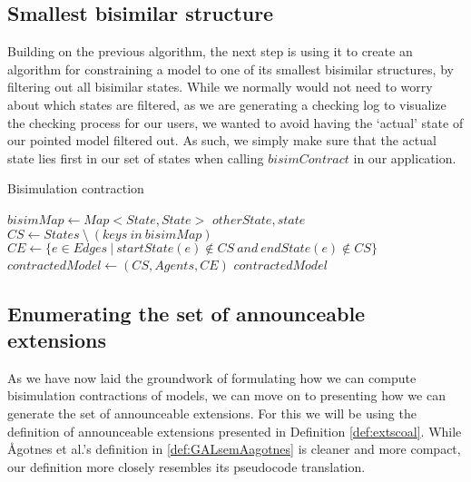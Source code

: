 \subsection{Smallest bisimilar structure}

Building on the previous algorithm, the next step is using it to create an algorithm for constraining a model to one of its smallest bisimilar structures, by filtering out all bisimilar states. While we normally would not need to worry about which states are filtered, as we are generating a checking log to visualize the checking process for our users, we wanted to avoid having the `actual' state of our pointed model filtered out. As such, we simply make sure that the actual state lies first in our set of states when calling $bisimContract$ in our application. 

\begin{algorithm}
	\caption{Bisimulation contraction}
	\label{alg:bisimContract}
	\begin{algorithmic}
			\State $bisimMap \gets Map<State, State>$
						\State {} {$otherState, state$}
					\EndIf
				\EndFor
			\EndFor
			\State $CS \gets States \ \setminus \ (keys \ in \ bisimMap)$
			\State $CE \gets \{ e \in Edges ~|~ startState(e) \not\in CS \ and \ endState(e) \not\in CS\}$
			\State $contractedModel \gets (CS, Agents, CE)$
			\State \Return $contractedModel$
		\EndFunction
	\end{algorithmic}
\end{algorithm}

\subsection{Enumerating the set of announceable extensions}

As we have now laid the groundwork of formulating  how we can compute bisimulation contractions of models, we can move on to presenting how we can generate the set of announceable extensions. For this we will be using the definition of announceable extensions presented in Definition \ref{def:extscoal}. While Ågotnes et al.'s definition in \ref{def:GALsemAagotnes} is cleaner and more compact, our definition more closely resembles its  pseudocode translation.

